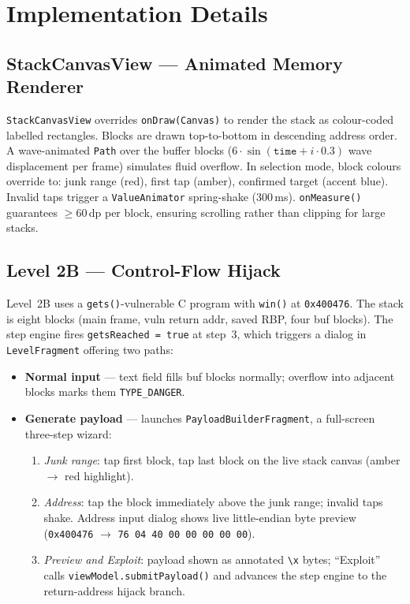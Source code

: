 \documentclass[12pt,a4paper]{article}
\begin{document}
\section{Implementation Details}

\subsection{StackCanvasView --- Animated Memory Renderer}

\texttt{StackCanvasView} overrides \texttt{onDraw(Canvas)} to render the stack as
colour-coded labelled rectangles. Blocks are drawn top-to-bottom in descending
address order. A wave-animated \texttt{Path} over the buffer blocks
($6 \cdot \sin(\texttt{time} + i \cdot 0.3)$ wave displacement per frame) simulates
fluid overflow. In selection mode, block colours override to: junk range (red),
first tap (amber), confirmed target (accent blue). Invalid taps trigger a
\texttt{ValueAnimator} spring-shake (300\,ms). \texttt{onMeasure()} guarantees
$\geq$60\,dp per block, ensuring scrolling rather than clipping for large stacks.

\subsection{Level 2B --- Control-Flow Hijack}

Level~2B uses a \texttt{gets()}-vulnerable C program with \texttt{win()} at
\texttt{0x400476}. The stack is eight blocks (main frame, vuln return addr, saved
RBP, four buf blocks). The step engine fires \texttt{getsReached = true} at step~3,
which triggers a dialog in \texttt{LevelFragment} offering two paths:

\begin{itemize}[leftmargin=1.5em, itemsep=3pt]
    \item \textbf{Normal input} --- text field fills buf blocks normally; overflow
    into adjacent blocks marks them \texttt{TYPE\_DANGER}.
    \item \textbf{Generate payload} --- launches \texttt{PayloadBuilderFragment},
    a full-screen three-step wizard:
    \begin{enumerate}[leftmargin=1em]
        \item \textit{Junk range}: tap first block, tap last block on the live
        stack canvas (amber $\to$ red highlight).
        \item \textit{Address}: tap the block immediately above the junk range;
        invalid taps shake. Address input dialog shows live little-endian byte
        preview (\texttt{0x400476} $\to$ \texttt{76 04 40 00 00 00 00 00}).
        \item \textit{Preview and Exploit}: payload shown as annotated
        \texttt{\textbackslash x} bytes; ``Exploit'' calls
        \texttt{viewModel.submitPayload()} and advances the step engine to the
        return-address hijack branch.
    \end{enumerate}
\end{itemize}
\end{document}
